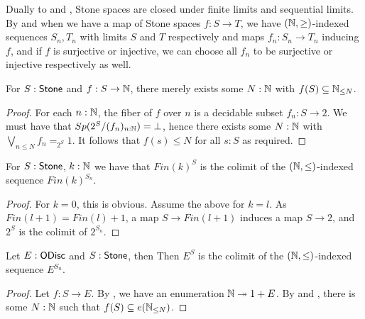 \begin{remark}\label{StoneClosedUnderPullback}\label{ProFiniteMapsFactorization}
  Dually to  and , 
  Stone spaces are closed under finite limits and sequential limits.
  By  and 
   when we have a map of Stone spaces $f:S\to T$, 
  we have $(\mathbb{N},\geq)$-indexed sequences $S_n,T_n$ with limits $S$ and $T$ respectively
  and maps $f_n:S_n\to T_n$ inducing $f$, and if $f$ is surjective or injective, we 
  can choose all $f_n$ to be surjective or injective respectively as well. 
\end{remark}
\begin{lemma}\label{MapsStoneToNareBounded}
  For $S:\mathsf{Stone}$ and $f:S \to \mathbb{N}$, there merely exists some $N:\mathbb{N}$ with $f(S)\subseteq \mathbb{N}_{\leq N}$. 
\end{lemma}
\begin{proof}
  For each $n:\mathbb{N}$, the fiber of $f$ over $n$ is a decidable subset $f_n:S \to 2$. 
  We must have that $Sp(2^S/(f_n)_{n:\mathbb{N}}) = \bot$, hence there exists some $N:\mathbb{N}$ with 
  $\bigvee_{n\leq N} f_n =_{2^S} 1 $. 
  It follows that $f(s)\leq N$ for all $s:S$ as required. 
\end{proof}
%
\begin{lemma}
  For $S:\mathsf{Stone}$, $k:\mathbb{N}$ we have that ${Fin(k)}^S$ is the colimit of the $(\mathbb{N},\leq)$-indexed sequence
  $Fin(k)^{S_n}$.
\end{lemma}
\begin{proof}
  For $k = 0$, this is obvious. 
  Assume the above for $k = l$. As $Fin(l+1) = Fin(l) + 1$, 
  a map $S\to Fin(l+1)$ induces a map $S\to 2$, 
  and $2^S$ is the colimit of $2^{S_n}$.

\end{proof}

\begin{lemma}\label{scott-continuity}
  Let $E:\mathsf{ODisc}$ and $S:\mathsf{Stone}$, then 
  Then $E^S$ is the colimit of the $(\mathbb{N},\leq)$-indexed sequence $E^{S_n}$.
\end{lemma}
\begin{proof}
  Let $f:S \to E$. By , 
  we have an enumeration $\mathbb{N}\twoheadrightarrow 1 + E$. 
  By  and , there is some $N:\mathbb{N}$ such that 
  $f(S)\subseteq e(\mathbb{N}_{\leq N})$. 




\end{proof} 

